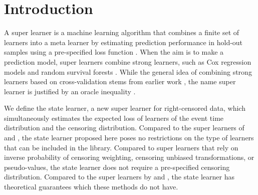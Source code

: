 \section{Introduction}
\label{sec:introduction}

A super learner is a machine learning algorithm that combines a finite
set of learners into a meta learner by estimating prediction
performance in hold-out samples using a pre-specified loss function
\citep{van2007super}. When the aim is to make a prediction model,
super learners combine strong learners, such as Cox regression models
and random survival forests \citep[][Section 8.4]{gerds2021medical}.
While the general idea of combining strong learners based on cross-validation
stems from earlier work \citep{wolpert1992stacked,breiman1996stacked}, the
name super learner is justified by an oracle inequality
\citep{van2003unicv,vaart2006oracle}.

We define the state learner, a new super learner for right-censored data, which
simultaneously estimates the expected loss of learners of the event time
distribution and the censoring distribution. Compared to the super learners of
\cite{polley2011-sl-cens} and \cite{golmakani2020super}, the state learner
proposed here poses no restrictions on the type of learners that can be included
in the library. Compared to super learners that rely on inverse probability of
censoring weighting, censoring unbiased transformations, or pseudo-values, the
state learner does not require a pre-specified censoring distribution. Compared
to the super learners by \cite{han2021inverse} and \cite{westling2021inference},
the state learner has theoretical guarantees which these methods do not have.


